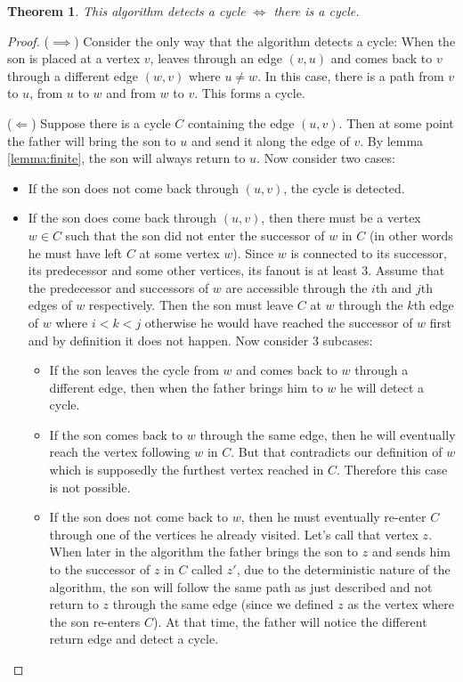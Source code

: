 \documentclass{article}
\newtheorem{theorem}{Theorem}
\begin{document}
\begin{theorem}This algorithm detects a cycle $\iff$ there is a cycle.\end{theorem}
\begin{proof}
($\implies$) Consider the only way that the algorithm detects a cycle: When the son is placed at a vertex $v$, leaves through an edge $(v,u)$ and comes back to $v$ through a different edge $(w,v)$ where $u\not=w$. In this case, there is a path from $v$ to $u$, from $u$ to $w$ and from $w$ to $v$. This forms a cycle.

($\Longleftarrow$) Suppose there is a cycle $C$ containing the edge $(u,v)$. Then at some point the father will bring the son to $u$ and send it along the edge of $v$. By lemma \ref{lemma:finite}, the son will always return to $u$. Now consider two cases:
\begin{itemize}
\item If the son does not come back through $(u,v)$, the cycle is detected.
\item If the son does come back through $(u,v)$, then there must be a vertex $w \in C$ such that the son did not enter the successor of $w$ in $C$ (in other words he must have left $C$ at some vertex $w$). Since $w$ is connected to its successor, its predecessor and some other vertices, its fanout is at least 3. Assume that the predecessor and successors of $w$ are accessible through the $i$th and $j$th edges of $w$ respectively. Then the son must leave $C$ at $w$ through the $k$th edge of $w$ where $i<k<j$ otherwise he would have reached the successor of $w$ first and by definition it does not happen. Now consider 3 subcases:
\begin{itemize}
\item If the son leaves the cycle from $w$ and comes back to $w$ through a different edge, then when the father brings him to $w$ he will detect a cycle.
\item If the son comes back to $w$ through the same edge, then he will eventually reach the vertex following $w$ in $C$. But that contradicts our definition of $w$ which is supposedly the furthest vertex reached in $C$. Therefore this case is not possible. %
\item If the son does not come back to $w$, then he must eventually re-enter $C$ through one of the vertices he already visited. Let's call that vertex $z$. When later in the algorithm the father brings the son to $z$ and sends him to the successor of $z$ in $C$ called $z'$, due to the deterministic nature of the algorithm, the son will follow the same path as just described and not return to $z$ through the same edge (since we defined $z$ as the vertex where the son re-enters $C$). At that time, the father will notice the different return edge and detect a cycle.
\end{itemize}
\end{itemize}


\end{proof}
\end{document}
